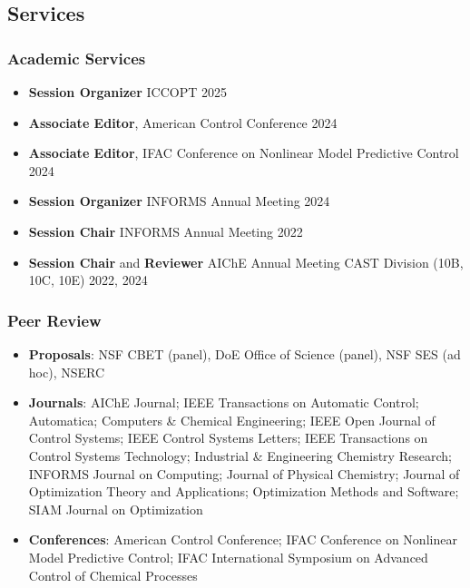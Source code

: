 \subsection*{Services}
\subsubsection*{Academic Services}
\begin{itemize}[leftmargin=*,itemsep=-1pt]
\item[] \textbf{Session Organizer} ICCOPT \hfill 2025
\item[] \textbf{Associate Editor}, American Control Conference \hfill 2024
\item[] \textbf{Associate Editor}, IFAC Conference on Nonlinear Model Predictive Control \hfill 2024
\item[] \textbf{Session Organizer} INFORMS Annual Meeting \hfill 2024
\item[] \textbf{Session Chair} INFORMS Annual Meeting \hfill 2022
\item[] \textbf{Session Chair} and \textbf{Reviewer} AIChE Annual Meeting CAST Division (10B, 10C, 10E) \hfill 2022, 2024
\end{itemize}

\subsubsection*{Peer Review}
\begin{itemize}[itemsep=1pt, parsep=0pt,leftmargin=*]
\item[] \textbf{Proposals}: NSF CBET (panel), DoE Office of Science (panel), NSF SES (ad hoc), NSERC
\item[] \textbf{Journals}: AIChE Journal; IEEE Transactions on Automatic Control; Automatica; Computers \& Chemical Engineering; IEEE Open Journal of Control Systems; IEEE Control Systems Letters; IEEE Transactions on Control Systems Technology; Industrial \& Engineering Chemistry Research; INFORMS Journal on Computing; Journal of Physical Chemistry; Journal of Optimization Theory and Applications; Optimization Methods and Software; SIAM Journal on Optimization
\item[] \textbf{Conferences}: American Control Conference; IFAC Conference on Nonlinear Model Predictive Control; IFAC International Symposium on Advanced Control of Chemical Processes 
\end{itemize}  

